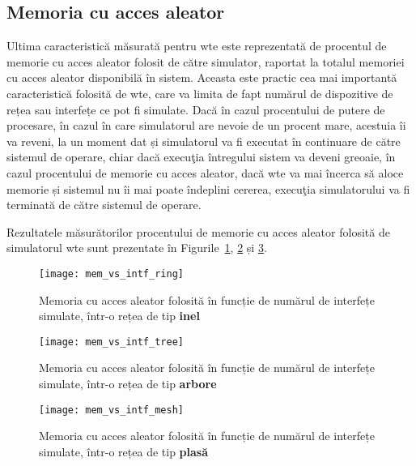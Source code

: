 \subsection{Memoria cu acces aleator}

Ultima caracteristică măsurată pentru \gls{wte} este reprezentată de procentul de memorie cu acces aleator folosit de către simulator, raportat la totalul memoriei cu acces aleator disponibilă în sistem. Aceasta este practic cea mai importantă caracteristică folosită de \gls{wte}, care va limita de fapt numărul de dispozitive de rețea sau interfețe ce pot fi simulate. Dacă în cazul procentului de putere de procesare, în cazul în care simulatorul are nevoie de un procent mare, acestuia îi va reveni, la un moment dat și simulatorul va fi executat în continuare de către sistemul de operare, chiar dacă execuţia întregului sistem va deveni greoaie, în cazul procentului de memorie cu acces aleator, dacă \gls{wte} va mai încerca să aloce memorie și sistemul nu îi mai poate îndeplini cererea, execuţia simulatorului va fi terminată de către sistemul de operare.

Rezultatele măsurătorilor procentului de memorie cu acces aleator folosită de simulatorul \gls{wte} sunt prezentate în Figurile~\ref{fig:mem_vs_intf_ring}, \ref{fig:mem_vs_intf_tree} și \ref{fig:mem_vs_intf_mesh}.

\begin{figure}[hp]
	\centering
	\texttt{[image: mem\_vs\_intf\_ring]}
	\caption{Memoria cu acces aleator folosită în funcție de numărul de interfețe simulate, într-o rețea de tip \textbf{inel}}
	\label{fig:mem_vs_intf_ring}
\end{figure}

\begin{figure}[hp]
	\centering
	\texttt{[image: mem\_vs\_intf\_tree]}
	\caption{Memoria cu acces aleator folosită în funcție de numărul de interfețe simulate, într-o rețea de tip \textbf{arbore}}
	\label{fig:mem_vs_intf_tree}
\end{figure}

\begin{figure}[hp]
	\centering
	\texttt{[image: mem\_vs\_intf\_mesh]}
	\caption{Memoria cu acces aleator folosită în funcție de numărul de interfețe simulate, într-o rețea de tip \textbf{plasă}}
	\label{fig:mem_vs_intf_mesh}
\end{figure}

